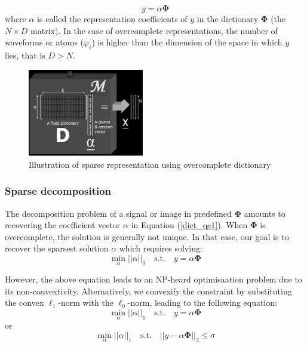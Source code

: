 \begin{equation}
    y = \alpha \mathbf{\Phi}
    \label{dict_qe1}
\end{equation}
where $\alpha$ is called the representation coefficients of $y$ in the dictionary $\mathbf{\Phi}$
(the $N \times D$ matrix). 
In the case of overcomplete representations, the number of waveforms or atoms ($\varphi_i$) is higher than the dimension of the space in which $y$ lies, that is $D > N$. 

\begin{figure}[!htbp]
\centering
\includegraphics[width=0.45\textwidth]{images/dictionary_sparse.png}
\caption{Illustration of sparse representation using overcomplete dictionary}
\label{dic1}
\end{figure}

\subsubsection{Sparse decomposition}
\label{BSS_sparse_decomp}
The decomposition problem of a signal or image in predefined $\mathbf{\Phi}$ amounts to recovering the coefficient vector $\alpha$ in Equation (\ref{dict_qe1}). When $\mathbf{\Phi}$ is overcomplete, the solution is generally not unique. In that case, our goal is to recover the sparsest solution $\alpha$ which requires solving:
\begin{equation}
    \min_{\alpha}||\alpha||_0 \quad \text{s.t.} \quad y = \alpha \mathbf{\Phi}
\end{equation}

However, the above equation leads to an NP-heard optimisaation problem due to its non-convextivity. Alternatively, we convexify the constraint by substituting the convex $\ell_1$-norm with the $\ell_0$-norm, leading to the following equation:
\begin{equation}
    \min_{\alpha} ||\alpha||_1 \quad \text{s.t.} \quad y = \alpha \mathbf{\Phi} 
    \label{l1_sparse}
\end{equation}
or\\
\begin{equation}
    \min_{\alpha}||\alpha||_1 \quad \text{s.t.} \quad || y - \alpha \mathbf{\Phi}||_2 \leq \sigma
\end{equation}

